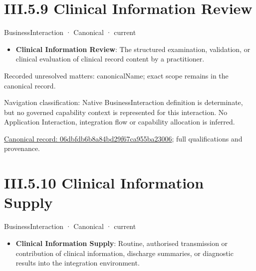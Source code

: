 \section*{III.5.9 Clinical Information Review}
\label{navigation:III.5.9}

\label{element:06dbfdb6b8a84bd29f67ca955ba23006}
{\small BusinessInteraction · Canonical · current}\par

\begin{itemize}


\item \textbf{Clinical Information Review}: The structured examination, validation, or clinical evaluation of clinical record content by a practitioner.

\end{itemize}

{\small Recorded unresolved matters: canonicalName; exact scope remains in the canonical record.}\par
{\small Navigation classification: Native BusinessInteraction definition is determinate, but no governed capability context is represented for this interaction. No Application Interaction, integration flow or capability allocation is inferred.}\par
{\footnotesize \href{../../../../continuum/business/business-interaction/06dbfdb6b8a84bd29f67ca955ba23006.md}{Canonical record: 06dbfdb6b8a84bd29f67ca955ba23006}; full qualifications and provenance.}\par
\section*{III.5.10 Clinical Information Supply}
\label{navigation:III.5.10}

\label{element:a6e2525ea3294ee3ab9a4ec3dd4dfe9f}
{\small BusinessInteraction · Canonical · current}\par

\begin{itemize}


\item \textbf{Clinical Information Supply}: Routine, authorised transmission or contribution of clinical information, discharge summaries, or diagnostic results into the integration environment.

\end{itemize}

